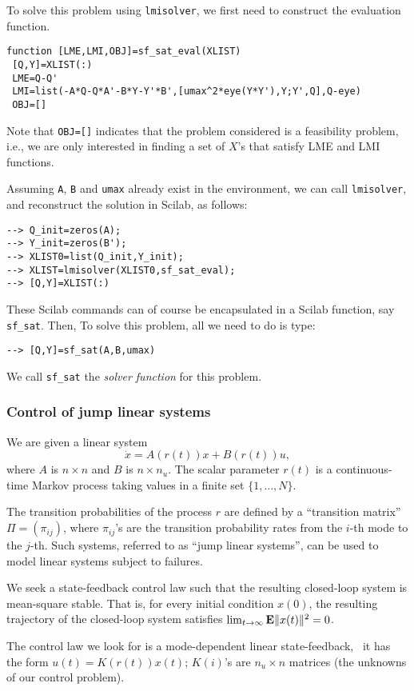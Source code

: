 To solve this problem using {\tt lmisolver},  we first need to construct
the evaluation function.
\begin{verbatim}
function [LME,LMI,OBJ]=sf_sat_eval(XLIST)
 [Q,Y]=XLIST(:)
 LME=Q-Q'
 LMI=list(-A*Q-Q*A'-B*Y-Y'*B',[umax^2*eye(Y*Y'),Y;Y',Q],Q-eye)
 OBJ=[]
\end{verbatim}
Note that {\tt OBJ=[]} indicates that
the problem considered is a feasibility problem, i.e., we are only
interested in finding a set of $X$'s that satisfy LME and LMI functions.


Assuming {\tt A}, {\tt B} and {\tt umax}
already exist in the environment, we can call {\tt lmisolver}, and
reconstruct the solution in Scilab, as follows:
\begin{verbatim}
--> Q_init=zeros(A);
--> Y_init=zeros(B');
--> XLIST0=list(Q_init,Y_init);
--> XLIST=lmisolver(XLIST0,sf_sat_eval);
--> [Q,Y]=XLIST(:)
\end{verbatim}
These Scilab commands can of course be encapsulated in
a Scilab function, say {\tt sf{\_}sat}. Then, To solve this problem,
all we need to do is type:
\begin{verbatim}
--> [Q,Y]=sf_sat(A,B,umax) 
\end{verbatim}
We call {\tt sf{\_}sat} the {\em solver function} for this problem.



\subsubsection{Control of jump linear systems}
\label{ex2}
We are given a linear system 
\[
\dot{x} = A(r(t))x+B(r(t))u,
\]
where $A$ is $n \times n$ and $B$ is $n \times n_u$.   The scalar
parameter $r(t)$ is a continuous-time Markov process taking values in
a finite set $\{1,\ldots,N\}$. 

The transition probabilities of the process $r$ are defined by a
``transition matrix'' $\Pi = (\pi_{ij})$, where $\pi_{ij}$'s are the 
transition probability rates from
the $i$-th mode to the $j$-th.  Such systems, referred to as ``jump
linear systems'', can be used to model linear systems subject to
failures.

We seek a state-feedback control law such that the resulting
closed-loop system is mean-square stable.  That is, for every initial
condition $x(0)$, the resulting trajectory of the closed-loop system
satisfies $\lim_{t \rightarrow \infty} \mbox{\bf E} \| x(t) \| ^2 = 0$.

The control law we look for is a mode-dependent linear state-feedback,
\ie\ it has the form $u(t) = K(r(t))x(t)$; $K(i)$'s are $n_u \times n$ matrices (the
unknowns of our control problem). 

